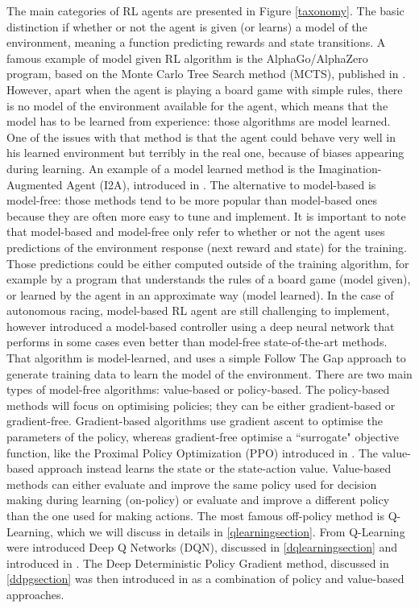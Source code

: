 The main categories of RL agents are presented in Figure \ref{taxonomy}. The basic distinction if whether or not the agent is given (or learns) a model of the environment, meaning a function predicting rewards and state transitions. A famous example of model given RL algorithm is the AlphaGo/AlphaZero program, based on the Monte Carlo Tree Search method (MCTS), published in \cite{Silver2016MasteringTG}. However, apart when the agent is playing a board game with simple rules, there is no model of the environment available for the agent, which means that the model has to be learned from experience: those algorithms are model learned. One of the issues with that method is that the agent could behave very well in his learned environment but terribly in the real one, because of biases appearing during learning. An example of a model learned method is the Imagination-Augmented Agent (I2A), introduced in \cite{I2A}. \newline
The alternative to model-based is model-free: those methods tend to be more popular than model-based ones because they are often more easy to tune and implement. \newline
It is important to note that model-based and model-free only refer to whether or not the agent uses predictions of the environment response (next reward and state) for the training. Those predictions could be either computed outside of the training algorithm, for example by a program that understands the rules of a board game (model given), or learned by the agent in an approximate way (model learned). In the case of autonomous racing, model-based RL agent are still challenging to implement, however \cite{modelbased} introduced a model-based controller using a deep neural network that performs in some cases even better than model-free state-of-the-art methods. That algorithm is model-learned, and uses a simple Follow The Gap approach to generate training data to learn the model of the environment. \newline
 There are two main types of model-free algorithms: value-based or policy-based. The policy-based methods will focus on optimising policies; they can be either gradient-based or gradient-free. Gradient-based algorithms use gradient ascent to optimise the parameters of the policy, whereas gradient-free optimise a ``surrogate" objective function, like the Proximal Policy Optimization (PPO) introduced in \cite{ppo}. The value-based approach instead learns the state or the state-action value. Value-based methods can either evaluate and improve the same policy used for decision making during learning (on-policy) or evaluate and improve a different policy than the one used for making actions. The most famous off-policy method is Q-Learning, which we will discuss in details in \ref{qlearningsection}. From Q-Learning were introduced Deep Q Networks (DQN), discussed in \ref{dqlearningsection} and introduced in \cite{drl}. The Deep Deterministic Policy Gradient method, discussed in \ref{ddpgsection} was then introduced in \cite{ddpg2015} as a combination of policy and value-based approaches.

